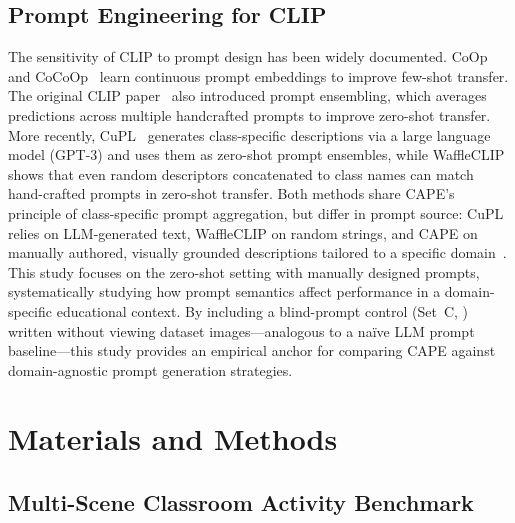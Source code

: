 \documentclass[symmetry,article,submit,pdftex,moreauthors]{Definitions/mdpi}
\begin{document}
\subsection{Prompt Engineering for CLIP}

The sensitivity of CLIP to prompt design has been widely documented.
CoOp~\cite{zhou2022learning} and CoCoOp~\cite{zhou2022conditional} learn continuous prompt embeddings to improve few-shot transfer.
The original CLIP paper~\cite{radford2021learning} also introduced prompt ensembling, which averages predictions across multiple handcrafted prompts to improve zero-shot transfer.
More recently, CuPL~\cite{pratt2023cupl} generates class-specific descriptions via a large language model (GPT-3) and uses them as zero-shot prompt ensembles, while WaffleCLIP~\cite{roth2023waffleclip} shows that even random descriptors concatenated to class names can match hand-crafted prompts in zero-shot transfer.
Both methods share CAPE's principle of class-specific prompt aggregation, but differ in prompt source: CuPL relies on LLM-generated text, WaffleCLIP on random strings, and CAPE on manually authored, visually grounded descriptions tailored to a specific domain~\cite{deng2025ai_agents,deng2025deepseek}.
This study focuses on the zero-shot setting with manually designed prompts, systematically studying how prompt semantics affect performance in a domain-specific educational context.
By including a blind-prompt control (Set~C, ) written without viewing dataset images---analogous to a na\"ive LLM prompt baseline---this study provides an empirical anchor for comparing CAPE against domain-agnostic prompt generation strategies.


\section{Materials and Methods}
\label{sec:method}

\subsection{Multi-Scene Classroom Activity Benchmark}
\label{sec:dataset}
\end{document}
